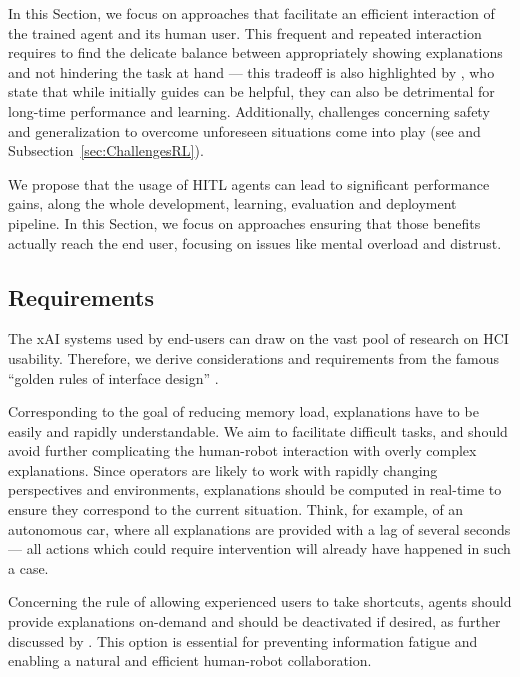 \documentclass[twoside,11pt]{article}
\begin{document}
\begin{enumerate}
In this Section, we focus on approaches that facilitate an efficient interaction of the trained agent and its human user. This frequent and repeated interaction requires to find the delicate balance between appropriately showing explanations and not hindering the task at hand --- this tradeoff is also highlighted by \citet{AndersonBischof:2013:PerformanceGestureGuides}, who state that while initially guides can be helpful, they can also be detrimental for long-time performance and learning. Additionally, challenges concerning safety and generalization to overcome unforeseen situations come into play (see \citet{RoyEtAl:2021:RLRoboticsChallenges} and Subsection~\ref{sec:ChallengesRL}). 

We propose that the usage of HITL agents can lead to significant performance gains, along the whole development, learning, evaluation and deployment pipeline. In this Section, we focus on approaches ensuring that those benefits actually reach the end user, focusing on issues like mental overload and distrust.

\subsection{Requirements}

The xAI systems used by end-users can draw on the vast pool of research on HCI usability. Therefore, we derive considerations and requirements from the famous ``golden rules of interface design'' \citep{ShneidermanEtAl:2016:GoldenRulesHCI}.

Corresponding to the goal of reducing memory load, explanations have to be easily and rapidly understandable. We aim to facilitate difficult tasks, and should avoid further complicating the human-robot interaction with overly complex explanations. Since operators are likely to work with rapidly changing perspectives and environments, explanations should be computed in real-time to ensure they correspond to the current situation. Think, for example, of an autonomous car, where all explanations are provided with a lag of several seconds --- all actions which could require intervention will already have happened in such a case. 

Concerning the rule of allowing experienced users to take shortcuts, agents should provide explanations on-demand and should be deactivated if desired, as further discussed by \cite{AndersonBischof:2013:PerformanceGestureGuides}. This option is essential for preventing information fatigue and enabling a natural and efficient human-robot collaboration. 


\end{enumerate}
\end{document}
